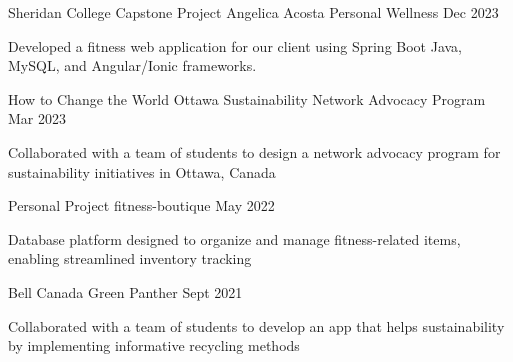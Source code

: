 \begin{cventries}
  \cventry
    {Sheridan College Capstone Project}
    {Angelica Acosta Personal Wellness}
    {}
    {Dec 2023}
    {
      \begin{cvitems}
        \item {Developed a fitness web application for our client using Spring Boot Java, MySQL, and Angular/Ionic frameworks.}
        \end{cvitems}
    }
  \cventry
    {How to Change the World}
    {Ottawa Sustainability Network Advocacy Program}
    {}
    {Mar 2023}
    {
      \begin{cvitems}
        \item {Collaborated with a team of students to design a network advocacy program for sustainability initiatives in Ottawa, Canada}      
        \end{cvitems}
    }
   \cventry
    {Personal Project}
    {fitness-boutique}
    {}
    {May 2022}
    {
      \begin{cvitems}
        \item {Database platform designed to organize and manage fitness-related items, enabling streamlined inventory tracking}      
        \end{cvitems}
    }
      \cventry
    {Bell Canada}
    {Green Panther}
    {}
    {Sept 2021}
    {
      \begin{cvitems}
        \item {Collaborated with a team of students to develop an app that helps sustainability by implementing informative recycling methods}      
        \end{cvitems}
    }
\end{cventries}
